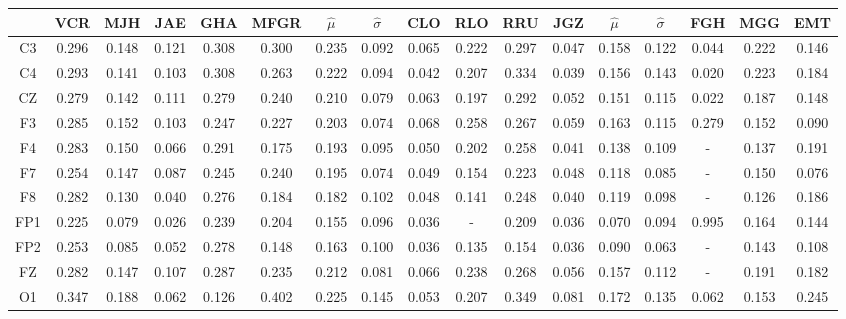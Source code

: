 \begin{SidewaysFigure}
\centering
\begin{tabular}{c||ccccc|cc||cccc|cc||ccc}
& VCR & MJH & JAE & GHA & MFGR &$\widehat{\mu}$ & $\widehat{\sigma}$
& CLO & RLO & RRU & JGZ &$\widehat{\mu}$ & $\widehat{\sigma}$
& FGH & MGG & EMT \\
\hline
 C3 & 0.296    & 0.148    & 0.121    & 0.308    & 0.300    & 0.235    & 0.092    & 0.065    & 0.222    & 0.297    & 0.047    & 0.158    & 0.122    & 0.044    & 0.222    & 0.146     \\
 C4 & 0.293    & 0.141    & 0.103    & 0.308    & 0.263    & 0.222    & 0.094    & 0.042    & 0.207    & 0.334    & 0.039    & 0.156    & 0.143    & 0.020    & 0.223    & 0.184     \\
 CZ & 0.279    & 0.142    & 0.111    & 0.279    & 0.240    & 0.210    & 0.079    & 0.063    & 0.197    & 0.292    & 0.052    & 0.151    & 0.115    & 0.022    & 0.187    & 0.148     \\
 F3 & 0.285    & 0.152    & 0.103    & 0.247    & 0.227    & 0.203    & 0.074    & 0.068    & 0.258    & 0.267    & 0.059    & 0.163    & 0.115    & 0.279    & 0.152    & 0.090     \\
 F4 & 0.283    & 0.150    & 0.066    & 0.291    & 0.175    & 0.193    & 0.095    & 0.050    & 0.202    & 0.258    & 0.041    & 0.138    & 0.109    & -      & 0.137    & 0.191     \\
 F7 & 0.254    & 0.147    & 0.087    & 0.245    & 0.240    & 0.195    & 0.074    & 0.049    & 0.154    & 0.223    & 0.048    & 0.118    & 0.085    & -      & 0.150    & 0.076     \\
 F8 & 0.282    & 0.130    & 0.040    & 0.276    & 0.184    & 0.182    & 0.102    & 0.048    & 0.141    & 0.248    & 0.040    & 0.119    & 0.098    & -      & 0.126    & 0.186     \\
 FP1 & 0.225    & 0.079    & 0.026    & 0.239    & 0.204    & 0.155    & 0.096    & 0.036    & -      & 0.209    & 0.036    & 0.070    & 0.094    & 0.995    & 0.164    & 0.144     \\
 FP2 & 0.253    & 0.085    & 0.052    & 0.278    & 0.148    & 0.163    & 0.100    & 0.036    & 0.135    & 0.154    & 0.036    & 0.090    & 0.063    & -      & 0.143    & 0.108     \\
 FZ & 0.282    & 0.147    & 0.107    & 0.287    & 0.235    & 0.212    & 0.081    & 0.066    & 0.238    & 0.268    & 0.056    & 0.157    & 0.112    & -      & 0.191    & 0.182     \\
 O1 & 0.347    & 0.188    & 0.062    & 0.126    & 0.402    & 0.225    & 0.145    & 0.053    & 0.207    & 0.349    & 0.081    & 0.172    & 0.135    & 0.062    & 0.153    & 0.245     \\

\end{tabular}
\end{SidewaysFigure}

